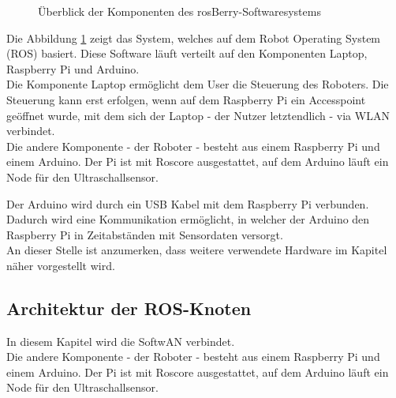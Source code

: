 \documentclass[conference]{IEEEtran}
\begin{document}
	\begin{figure}[!ht]
		\centering
		\def\svgwidth{9cm}
		
		\caption{Überblick der Komponenten des rosBerry-Softwaresystems}
		\label{Gesamtzusammenhang}
	\end{figure}
	Die Abbildung \ref{Gesamtzusammenhang} zeigt das System, welches auf 
	dem Robot Operating System (ROS) basiert.
	Diese Software läuft verteilt auf den Komponenten Laptop, Raspberry Pi und Arduino.
	\\
	Die Komponente Laptop ermöglicht dem User die Steuerung des 
	Roboters.
	Die Steuerung kann erst erfolgen, wenn auf dem Raspberry Pi ein Accesspoint geöffnet wurde, mit dem sich der Laptop - der Nutzer letztendlich - via WLAN verbindet.
	\\
	Die andere Komponente - der Roboter - besteht aus einem Raspberry Pi und einem Arduino.
	Der Pi ist mit Roscore ausgestattet, auf dem Arduino läuft ein Node für den Ultraschallsensor.
	
	Der Arduino wird durch ein USB Kabel mit dem Raspberry Pi verbunden.
	Dadurch wird eine Kommunikation ermöglicht, in welcher der Arduino den Raspberry Pi in Zeitabständen mit Sensordaten versorgt.
	\\
	An dieser Stelle ist anzumerken, dass weitere verwendete Hardware im Kapitel  näher vorgestellt wird.
	
	\subsection{Architektur der ROS-Knoten}\label{sec:Architektur}
	
	In diesem Kapitel wird die SoftwAN verbindet.
	\\
	Die andere Komponente - der Roboter - besteht aus einem Raspberry Pi 
	und einem Arduino.
	Der Pi ist mit Roscore ausgestattet, auf dem Arduino läuft ein Node für 
	den Ultraschallsensor.
	
\end{document}
